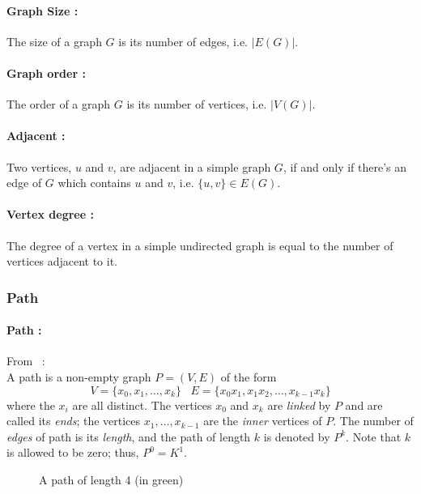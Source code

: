 \paragraph{Graph Size :}
The size of a graph $G$ is its number of edges, i.e. $|E(G)|$.

\paragraph{Graph order :}
The order of a graph $G$ is its number of vertices, i.e. $|V(G)|$.

\paragraph{Adjacent :}
Two vertices, $u$ and $v$, are adjacent in a simple graph $G$, if and only if
there's an edge of $G$ which contains $u$ and $v$, i.e. $\{u,v\} \in E(G)$.

\paragraph{Vertex degree :}
The degree of a vertex in a simple undirected graph is equal to the number of
vertices adjacent to it.

\subsubsection{Path}
\paragraph{Path :}
From~\cite{Diestel} :\\
A path is a non-empty graph $P = (V, E)$ of the form
$$ V = \{x_0,x_1, \dots, x_k \} \;\;\; E=\{x_0x_1, x_1x_2, \dots, x_{k-1}x_k \}$$
where the $x_i$ are all distinct. The vertices $x_0$ and $x_k$ are {\em linked}
by $P$ and are called its {\em ends}; the vertices $x_1, \dots, x_{k-1}$ are the
{\em inner} vertices of $P$. The number of {\em edges} of path is its
{\em length}, and the path of length $k$ is denoted by $P^k$. Note that $k$ is
allowed to be zero; thus, $P^0 = K^1$.

\begin{figure}[!h]
  \begin{center}
    
  \end{center}
  \caption{A path of length 4 (in green)}
\end{figure}

